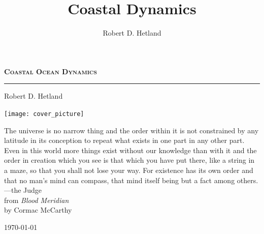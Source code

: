 \documentclass[11pt]{report}
\author{Robert D. Hetland}
\title{Coastal Dynamics}
\numberwithin{equation}{section}
\begin{document}
\lstset{language=Python,
        basicstyle=\small\ttfamily,
        commentstyle=\itshape,
        showstringspaces=false,
        frame=lines, 
        numbers=left, 
        numberstyle=\tiny}


\begin{titlepage}
    \begin{center}
        
        \vspace*{1cm}
        
        { \huge \bfseries\scshape Coastal Ocean Dynamics}\\[1.5cm]
        
        \hrule
        
        \vspace{1.5cm}
        
        {\huge Robert D. Hetland}
        
        \vspace{2cm}
        \texttt{[image: cover\_picture]}
        
        \vspace{0.2cm}
        \begin{minipage}[h]{6in}
        {\footnotesize The universe is no narrow thing and the order within it is not constrained by any latitude in its conception to repeat what exists in one part in any other part.  Even in this world more things exist without our knowledge than with it and the order in creation which you see is that which you have put there, like a string in a maze, so that you shall not lose your way.  For existence has its own order and that no man's mind can compass, that mind itself being but a fact among others.\\

        ---the Judge\\
        
        from \emph{Blood Meridian}\\
        by Cormac McCarthy}
        
        \end{minipage}
        
        \vfill
        \hfill
        \today
        
    \end{center}
\end{titlepage}


\clearpage
{}

\tableofcontents

\clearpage
\end{document}
